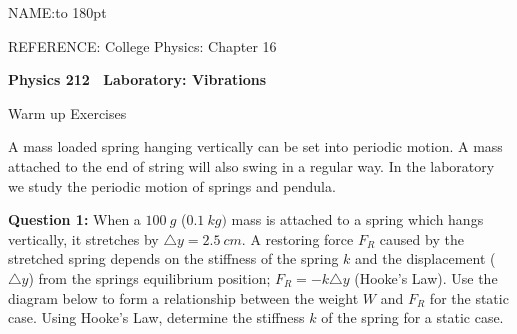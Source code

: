 \documentclass[14pt]{article}
\def \courseno {212}
\newcommand{\subheading}[1]{{\boldtenrm #1}}
\newcommand{\referencepages}[1]{\vskip -25pt{\eightrm REFERENCE: #1}}
\newcommand{\materials}[1]{\vskip -15pt{\eightrm MATERIALS: #1}}
\def \setheadline#1{\footline{}\headline={\hfill {\eightrm #1 p. \folio}}}
\begin{document}
\thispagestyle{plain} %
\baselineskip 14pt

\def \headline{\hfill {NAME:\hbox to 180pt{\hrulefill}}}
\def \footline={20230130}%
\def \setheadline#1{\footline{}\headline={\hfill {\eightrm #1 p. \folio}}}
\vskip 0pt  \headline

\referencepages{College Physics: Chapter 16}

\newcount \questionno
\newcount \sumquestions {}
\def \question#1{\advance\questionno by 1{\bf Question~\number\questionno:}{\global\advance\sumquestions by #1} }
\def \showsumquestions{\immediate \write0 {>>> Sum of questions >>> \number\sumquestions pts}}

\def \degc{$^oC$}

{\bf Physics \courseno~ Laboratory: Vibrations} %

\subheading{Warm up Exercises~} 

A mass loaded spring hanging vertically can be set into periodic motion. A mass attached to the end of string will also swing in a regular way.  In the laboratory we study the periodic motion of springs and pendula.

{\bf Question 1:} When a $100~g$ ($0.1~kg)$ mass is attached to a spring which hangs vertically, it stretches by $\triangle y=2.5~cm$. A restoring force $F_R$ caused by the stretched spring depends on the stiffness of the spring $k$ and the displacement ($\triangle y$) from the springs equilibrium position; $F_R=-k\triangle y$ (Hooke's Law). Use the diagram below to form a relationship between the weight $W$ and $F_R$ for the static case. Using Hooke's Law, determine the stiffness $k$ of the spring for a static case.  %

\end{document}
